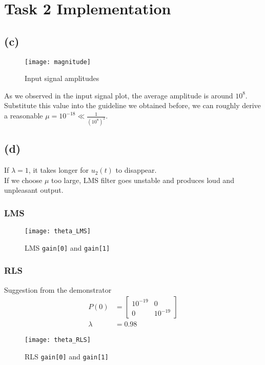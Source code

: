 \documentclass{article}
\begin{document}
\section*{Task 2 Implementation}

\subsection*{(c)}

\begin{figure}[H]
\centering
\texttt{[image: magnitude]}
\caption{Input signal amplitudes}
\end{figure}

As we observed in the input signal plot, the average amplitude is around $10^8$. Substitute this value into the guideline we obtained before, we can roughly derive a reasonable $\mu = 10^{-18} \ll \frac{1}{(10^8)^2}$.

\subsection*{(d)}

If $\lambda = 1$, it takes longer for $u_2(t)$ to disappear.\\

If we choose $\mu$ too large, LMS filter goes unstable and produces loud and unpleasant output.

\subsubsection*{LMS}

\begin{figure}[H]
\centering
\texttt{[image: theta\_LMS]}
\caption{LMS \texttt{gain[0]} and \texttt{gain[1]}}
\end{figure}

\subsubsection*{RLS}

Suggestion from the demonstrator
\begin{align*}
P(0) &=
\begin{bmatrix}
10^{-19} &0\\
0 &10^{-19}
\end{bmatrix}\\
\lambda &= 0.98
\end{align*}

\begin{figure}[H]
\centering
\texttt{[image: theta\_RLS]}
\caption{RLS \texttt{gain[0]} and \texttt{gain[1]}}
\end{figure}
\end{document}
